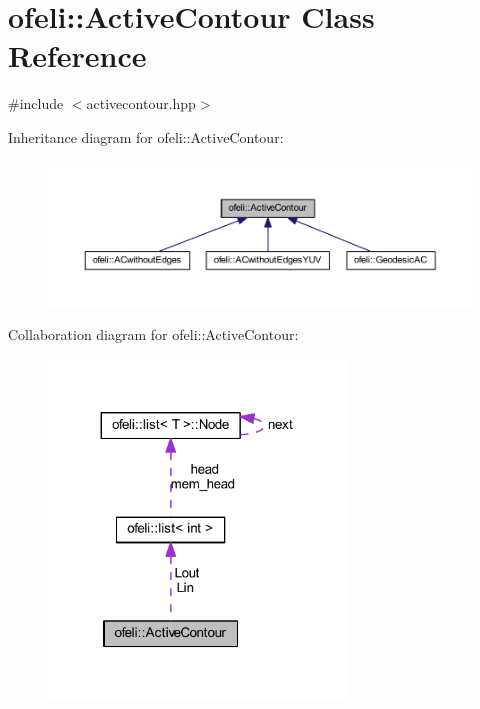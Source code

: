 \hypertarget{classofeli_1_1_active_contour}{\section{ofeli\-:\-:Active\-Contour Class Reference}
\label{classofeli_1_1_active_contour}
}


{\ttfamily \#include $<$activecontour.\-hpp$>$}



Inheritance diagram for ofeli\-:\-:Active\-Contour\-:\nopagebreak
\begin{figure}[H]
\begin{center}
\leavevmode
\includegraphics[width=350pt]{classofeli_1_1_active_contour__inherit__graph}
\end{center}
\end{figure}


Collaboration diagram for ofeli\-:\-:Active\-Contour\-:\nopagebreak
\begin{figure}[H]
\begin{center}
\leavevmode
\includegraphics[width=224pt]{classofeli_1_1_active_contour__coll__graph}
\end{center}
\end{figure}
